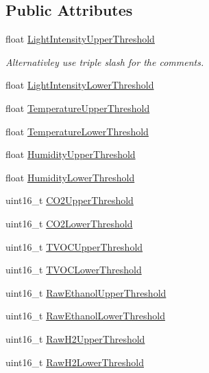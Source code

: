 \subsection*{Public Attributes}
\begin{DoxyCompactItemize}
\item 
float \hyperlink{structTargetEnvironmentData_a7755db8c43daca465d5ac3730d57f7d8}{Light\+Intensity\+Upper\+Threshold}
\begin{DoxyCompactList}\small\item\em Alternativley use triple slash for the comments. \end{DoxyCompactList}\item 
float \hyperlink{structTargetEnvironmentData_a4619dffef19d60fd03d690fd756b595c}{Light\+Intensity\+Lower\+Threshold}
\item 
float \hyperlink{structTargetEnvironmentData_a76d83792b14767a1bc23b57c027232d6}{Temperature\+Upper\+Threshold}
\item 
float \hyperlink{structTargetEnvironmentData_a908d87e4fd88c513d671c591d0710ce0}{Temperature\+Lower\+Threshold}
\item 
float \hyperlink{structTargetEnvironmentData_a8db2e041382994d52fe089f9953ff437}{Humidity\+Upper\+Threshold}
\item 
float \hyperlink{structTargetEnvironmentData_af40ad465a6e74c13caf26b3672b7470f}{Humidity\+Lower\+Threshold}
\item 
uint16\+\_\+t \hyperlink{structTargetEnvironmentData_ae54690e5e73396443f43d3bbd9851d3c}{C\+O2\+Upper\+Threshold}
\item 
uint16\+\_\+t \hyperlink{structTargetEnvironmentData_a9584deda60eea2102608122a6ca6f791}{C\+O2\+Lower\+Threshold}
\item 
uint16\+\_\+t \hyperlink{structTargetEnvironmentData_afdddfbd81d51a1831704d85b08e9df1a}{T\+V\+O\+C\+Upper\+Threshold}
\item 
uint16\+\_\+t \hyperlink{structTargetEnvironmentData_a87019e6e28b712edf7900d6deef3e2b5}{T\+V\+O\+C\+Lower\+Threshold}
\item 
uint16\+\_\+t \hyperlink{structTargetEnvironmentData_ab0bb15f753619e3013f49dda97d15eab}{Raw\+Ethanol\+Upper\+Threshold}
\item 
uint16\+\_\+t \hyperlink{structTargetEnvironmentData_a113b5e5bcd192bcbdf5e845836c0be82}{Raw\+Ethanol\+Lower\+Threshold}
\item 
uint16\+\_\+t \hyperlink{structTargetEnvironmentData_a649b7d8751b329fba9494b5c730a55fd}{Raw\+H2\+Upper\+Threshold}
\item 
uint16\+\_\+t \hyperlink{structTargetEnvironmentData_abffe923b25c5ef2ccc1c9666c7397ed7}{Raw\+H2\+Lower\+Threshold}
\end{DoxyCompactItemize}


